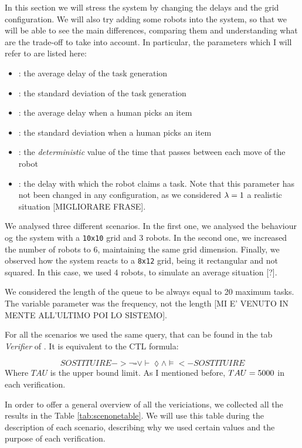 In this section we will stress the system by changing the delays and the grid configuration. We will also try adding some robots into the system, so that we will be able to see the main differences, comparing them and understanding what are the trade-off to take into account. In particular, the parameters which I will refer to are listed here:
\begin{itemize}
    \item \mT: the average delay of the task generation
    \item \vT: the standard deviation of the task generation
    \item \mH: the average delay when a human picks an item
    \item \vH: the standard deviation when a human picks an item
    \item \K: the \emph{deterministic} value of the time that passes between each move of the robot
    \item \expdel: the delay with which the robot claims a task. Note that this parameter has not been changed in any configuration, as we considered $\lambda= 1$ a realistic situation [MIGLIORARE FRASE].
\end{itemize}

We analysed three different scenarios. In the first one, we analysed the behaviour og the system with a \texttt{10x10} grid and 3 robots. In the second one, we increased the number of robots to 6, maintaining the same grid dimension. Finally, we observed how the system reacts to a \texttt{8x12} grid, being it rectangular and not squared. In this case, we used 4 robots, to simulate an average situation [?].

We considered the length of the queue to be always equal to 20 maximum tasks. The variable parameter was the frequency, not the length [MI E' VENUTO IN MENTE ALL'ULTIMO POI LO SISTEMO].

For all the scenarios we used the same query, that can be found in the tab \emph{Verifier} of \UPPAAL. It is equivalent to the CTL formula:

\begin{equation}
    SOSTITUIRE ->  \lnot \square \vee \vdash \lozenge \wedge \models  <- SOSTITUIRE
\end{equation}
Where $TAU$ is the upper bound limit. As I mentioned before, $TAU = 5000$ in each verification.

In order to offer a general overview of all the vericiations, we collected all the results in the Table \ref{tab:scenonetable}. We will use this table during the description of each scenario, describing why we used certain values and the purpose of each verification.

